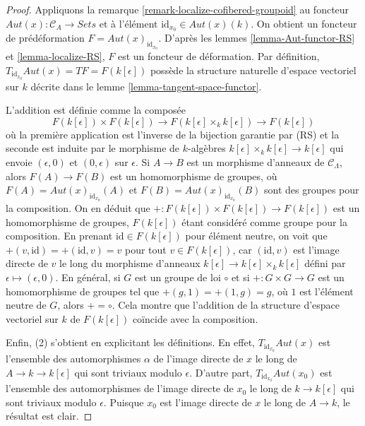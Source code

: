 \begin{proof}
Appliquons la remarque \ref{remark-localize-cofibered-groupoid} au foncteur
$\mathit{Aut}(x) : \mathcal{C}_A \to \textit{Sets}$ et à l'élément
$\text{id}_{x_0} \in \mathit{Aut}(x)(k)$. On obtient un foncteur de
prédéformation $F = \mathit{Aut}(x)_{\text{id}_{x_0}}$. D'après les lemmes
\ref{lemma-Aut-functor-RS} et \ref{lemma-localize-RS}, $F$ est un foncteur de
déformation. Par définition,
$T_{\text{id}_{x_0}} \mathit{Aut}(x) = TF = F(k[\epsilon])$
possède la structure naturelle d'espace vectoriel sur $k$ décrite dans le
lemme \ref{lemma-tangent-space-functor}.

\medskip\noindent
L'addition est définie comme la composée
$$
F(k[\epsilon]) \times F(k[\epsilon]) \longrightarrow
F(k[\epsilon] \times_k k[\epsilon]) \longrightarrow
F(k[\epsilon])
$$
où la première application est l'inverse de la bijection garantie par (RS) et
la seconde est induite par le morphisme de $k$-algèbres
$k[\epsilon] \times_k k[\epsilon] \to k[\epsilon]$
qui envoie $(\epsilon, 0)$ et $(0, \epsilon)$ sur $\epsilon$. Si $A \to B$
est un morphisme d'anneaux de $\mathcal{C}_\Lambda$, alors
$F(A) \to F(B)$ est un homomorphisme de groupes, où
$F(A) = \mathit{Aut}(x)_{\text{id}_{x_0}}(A)$ et
$F(B) = \mathit{Aut}(x)_{\text{id}_{x_0}}(B)$ sont des groupes pour la
composition. On en déduit que
$+ : F(k[\epsilon]) \times F(k[\epsilon])\to F(k[\epsilon])$
est un homomorphisme de groupes, $F(k[\epsilon])$ étant considéré comme groupe pour la
composition. En prenant $\text{id} \in F(k[\epsilon])$ pour élément neutre, on
voit que $+(v, \text{id}) =
+(\text{id}, v) = v$ pour tout
$v \in F(k[\epsilon])$, car $(\text{id}, v)$ est l'image directe de $v$ le
long du morphisme d'anneaux
$k[\epsilon] \to k[\epsilon] \times_k k[\epsilon]$ défini par
$\epsilon \mapsto (\epsilon, 0)$. En général, si $G$ est un groupe de loi
$\circ$ et si $+ : G \times G \to G$ est un homomorphisme de groupes tel que
$+(g, 1) = +(1, g) = g$, où $1$ est l'élément neutre de $G$, alors
$+ = \circ$. Cela montre que l'addition de la structure d'espace vectoriel sur
$k$ de $F(k[\epsilon])$ coïncide avec la composition.

\medskip\noindent
Enfin, (2) s'obtient en explicitant les définitions. En effet,
$T_{\text{id}_{x_0}} \mathit{Aut}(x)$ est l'ensemble des automorphismes
$\alpha$ de l'image directe de $x$ le long de $A \to k \to k[\epsilon]$ qui
sont triviaux modulo $\epsilon$. D'autre part,
$T_{\text{id}_{x_0}} \mathit{Aut}(x_0)$ est l'ensemble des automorphismes de
l'image directe de $x_0$ le long de $k \to k[\epsilon]$ qui sont triviaux
modulo $\epsilon$. Puisque $x_0$ est l'image directe de $x$ le long de
$A \to k$, le résultat est clair.
\end{proof}

